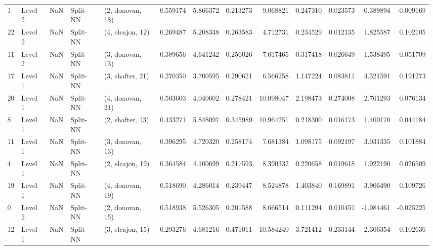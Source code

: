 \begin{tabular}{llrllrrrrrrrr}
1  &   Level 2 &    NaN &       Split-NN &  (2, donovan, 18) &   0.559174 &   5.866372 &  0.213273 &   9.068821 &             0.247310 &               0.023573 &           -0.389894 &             -0.009169 \\
22 &   Level 2 &    NaN &       Split-NN &  (4, elcajon, 12) &   0.269487 &   5.208348 &  0.263583 &   4.712731 &             0.234529 &               0.012135 &            1.825587 &              0.102105 \\
11 &   Level 2 &    NaN &       Split-NN &  (3, donovan, 13) &   0.389656 &   4.641242 &  0.256026 &   7.617465 &             0.317418 &               0.026649 &            1.538495 &              0.051709 \\
17 &   Level 1 &    NaN &       Split-NN &  (3, shafter, 21) &   0.270350 &   3.700595 &  0.290621 &   6.566258 &             1.147224 &               0.083811 &            4.321591 &              0.191273 \\
20 &   Level 1 &    NaN &       Split-NN &  (4, donovan, 21) &   0.503603 &   4.040602 &  0.278421 &  10.098047 &             2.198473 &               0.274008 &            2.761293 &              0.076134 \\
8  &   Level 1 &    NaN &       Split-NN &  (2, shafter, 13) &   0.433271 &   5.848097 &  0.345989 &  10.964251 &             0.218300 &               0.016173 &            1.400170 &              0.044184 \\
11 &   Level 1 &    NaN &       Split-NN &  (3, donovan, 13) &   0.396295 &   4.720320 &  0.258174 &   7.681384 &             1.098175 &               0.092197 &            3.031335 &              0.101884 \\
4  &   Level 1 &    NaN &       Split-NN &  (2, elcajon, 19) &   0.364584 &   4.100699 &  0.217593 &   8.390332 &             0.220658 &               0.019618 &            1.022190 &              0.026509 \\
19 &   Level 1 &    NaN &       Split-NN &  (4, donovan, 19) &   0.518690 &   4.286014 &  0.239447 &   8.524878 &             1.403840 &               0.169891 &            3.906490 &              0.109726 \\
0  &   Level 2 &    NaN &       Split-NN &  (2, donovan, 15) &   0.518938 &   5.526305 &  0.201588 &   8.666514 &             0.111294 &               0.010451 &           -1.084461 &             -0.025225 \\
12 &   Level 1 &    NaN &       Split-NN &  (3, elcajon, 15) &   0.293276 &   4.681216 &  0.471011 &  10.584240 &             3.721412 &               0.233144 &            2.306354 &              0.102636 \\

\end{tabular}
